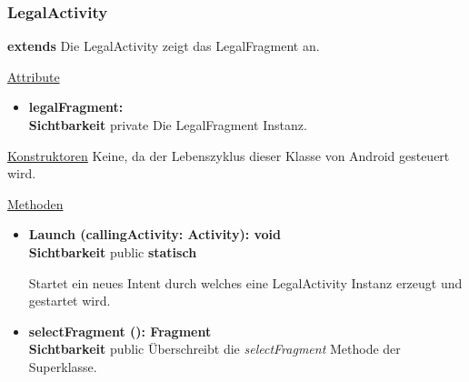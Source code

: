 \subsubsection{LegalActivity} \label{app:klasse:LegalActivity}
\textbf{extends}  \newline
Die LegalActivity zeigt das LegalFragment an.
\newline

\underline{Attribute}
\begin{itemize}
\itemsep0pt
\item \textbf{legalFragment: } \hfill\\ 
\textbf{Sichtbarkeit} private\newline
Die LegalFragment Instanz.

\end{itemize}

\underline{Konstruktoren}\newline
\indent Keine, da der Lebenszyklus dieser Klasse von Android gesteuert wird.\newline

\underline{Methoden}
\begin{itemize}
\itemsep0pt

\item \textbf{Launch (callingActivity: Activity): void}\hfill\\
\textbf{Sichtbarkeit} public \newline
\textbf{statisch} 

Startet ein neues Intent durch welches eine LegalActivity Instanz erzeugt und gestartet wird.

\item \textbf{selectFragment (): Fragment}\hfill\\
\textbf{Sichtbarkeit} public\newline
Überschreibt die \textit{selectFragment} Methode der Superklasse.

\end{itemize}